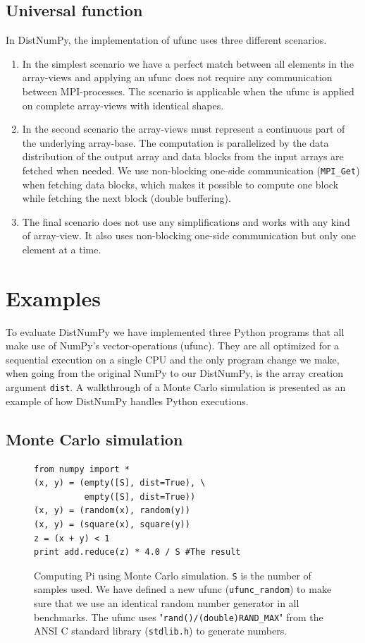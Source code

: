 \documentclass{sigplanconf}
\begin{document}
\subsection{Universal function}
In DistNumPy, the implementation of ufunc uses three different scenarios.
\begin{enumerate}
\item In the simplest scenario we have a perfect match between all elements in the array-views and applying an ufunc does not require any communication between MPI-processes. The scenario is applicable when the ufunc is applied on complete array-views with identical shapes.
\item In the second scenario the array-views must represent a continuous part of the underlying array-base. The computation is parallelized by the data distribution of the output array and data blocks from the input arrays are fetched when needed. We use non-blocking one-side communication (\texttt{MPI\_Get}) when fetching data blocks, which makes it possible to compute one block while fetching the next block (double buffering).
\item The final scenario does not use any simplifications and works with any kind of array-view. It also uses non-blocking one-side communication but only one element at a time.
\end{enumerate}


\section{Examples}\label{sec:examples}
To evaluate DistNumPy we have implemented three Python programs that all make use of NumPy's vector-operations (ufunc). They are all optimized for a sequential execution on a single CPU and the only program change we make, when going from the original NumPy to our DistNumPy, is the array creation argument \texttt{dist}. 
A walkthrough of a Monte Carlo simulation is presented as an example of how DistNumPy handles Python executions.


\subsection{Monte Carlo simulation}
\begin{figure}
\begin{lstlisting}
from numpy import *
(x, y) = (empty([S], dist=True), \
          empty([S], dist=True))
(x, y) = (random(x), random(y))
(x, y) = (square(x), square(y))
z = (x + y) < 1
print add.reduce(z) * 4.0 / S #The result
\end{lstlisting}
 \caption{Computing Pi using Monte Carlo simulation. \texttt{S} is the number of samples used. We have defined a new ufunc (\texttt{ufunc\_random}) to make sure that we use an identical random number generator in all benchmarks. The ufunc uses "\texttt{rand()/(double)RAND\_MAX}" from the ANSI C standard library (\texttt{stdlib.h}) to generate numbers.}
 \label{lst:montecarlo}
\end{figure}
\end{document}
